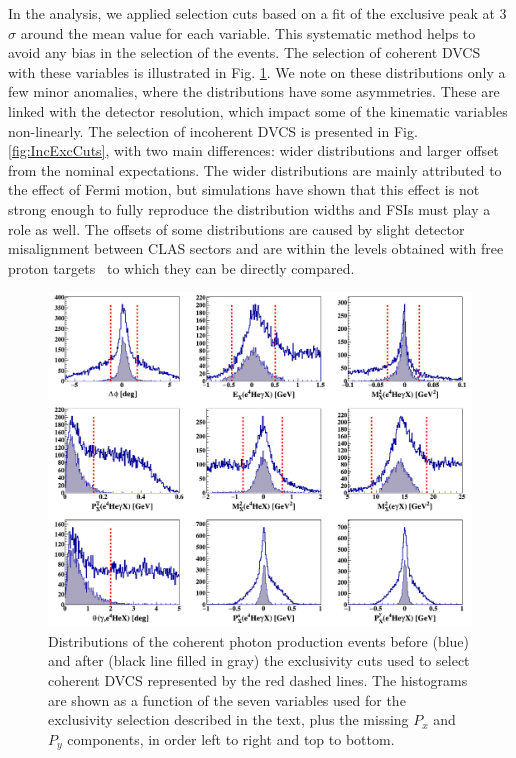 \documentclass[aps,prc,preprint,superscriptaddress]{revtex4}
\begin{document}
In the analysis, we applied selection cuts based on a fit of the exclusive peak at 3$\sigma$ around 
the mean value for each variable. This systematic method helps to avoid any bias 
in the selection of the events. The selection of coherent DVCS with these variables is illustrated in 
Fig. \ref{fig:CohExcCuts}. We note on these distributions only a few minor anomalies, where the 
distributions have some asymmetries. These are linked with the detector resolution, which impact
some of the kinematic variables non-linearly. The selection of incoherent DVCS is presented in 
Fig. \ref{fig:IncExcCuts}, with two main differences: wider distributions and larger
offset from the nominal expectations. The wider distributions are mainly attributed to the effect of 
Fermi motion, but simulations have shown that this effect is not strong enough to fully 
reproduce the distribution widths and FSIs must play a role as well. 
The offsets of some distributions are caused by slight detector 
misalignment between CLAS sectors and are within the levels obtained with free proton 
targets~\cite{HirlingerSaylor:2018bnu} to which they can be directly compared. 

\begin{figure}[tbp!]
\center
\includegraphics[trim=10 10 10 5,clip,width=16.5cm]{all_coh_exc_cuts.png}
        \caption{Distributions of the coherent photon production events before 
        (blue) and after (black line filled
	in gray) the exclusivity cuts used to select coherent DVCS represented by the 
	red dashed lines. The histograms are shown as a function of the 
	seven variables used for the exclusivity selection described in the text, 
	plus the missing $P_x$ and $P_y$ components, in order left to right and top to bottom. 
	}
\label{fig:CohExcCuts}
\end{figure}
\end{document}
